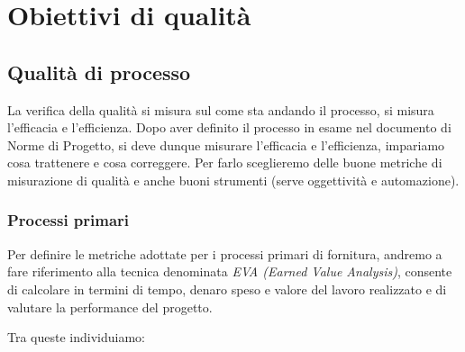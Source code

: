\section{Obiettivi di qualità}

\subsection{Qualità di processo}
La verifica della qualità si misura sul come sta andando il processo, si misura l'efficacia e l'efficienza.
Dopo aver definito il processo in esame nel documento di Norme di Progetto, si deve dunque misurare l'efficacia e l'efficienza, impariamo cosa trattenere e cosa correggere. Per farlo sceglieremo delle buone metriche di misurazione di qualità e anche buoni strumenti (serve oggettività e automazione).

\subsubsection{Processi primari}
Per definire le metriche adottate per i processi primari di fornitura, andremo a fare riferimento alla tecnica denominata \emph{EVA (Earned Value Analysis)}, consente di calcolare in termini di tempo, denaro speso e valore del lavoro realizzato e di valutare la performance del progetto.

Tra queste individuiamo:

